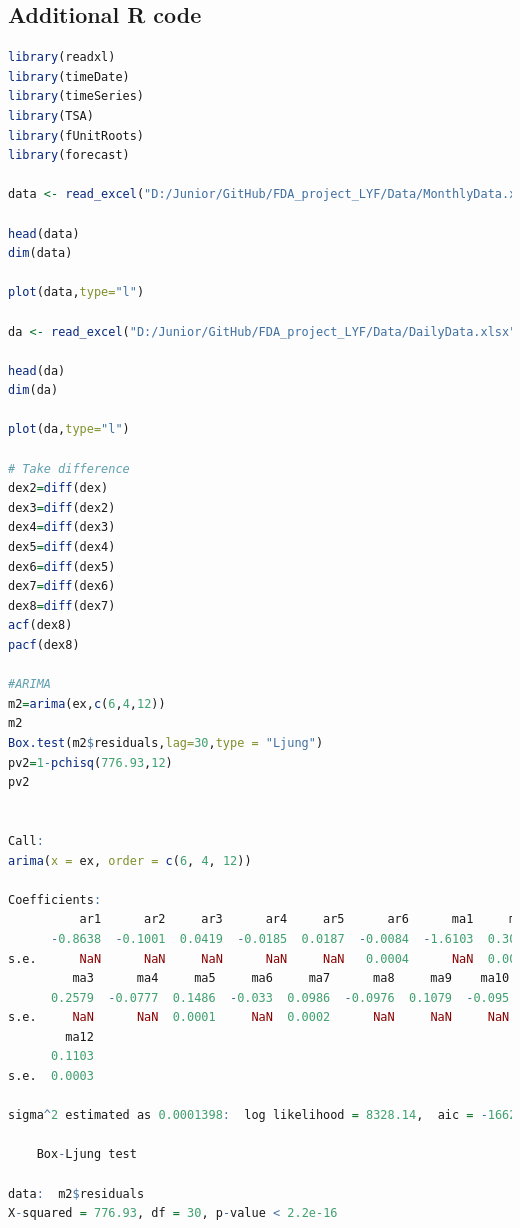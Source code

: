 \documentclass[12pt, a4paper, titlepage]{article}
\begin{document}
\subsection*{Additional R code}
\begin{lstlisting}[language=R] 
library(readxl)
library(timeDate)
library(timeSeries)
library(TSA)
library(fUnitRoots)
library(forecast)

data <- read_excel("D:/Junior/GitHub/FDA_project_LYF/Data/MonthlyData.xls")

head(data)
dim(data)

plot(data,type="l")

da <- read_excel("D:/Junior/GitHub/FDA_project_LYF/Data/DailyData.xlsx")

head(da)
dim(da)

plot(da,type="l")

# Take difference
dex2=diff(dex)
dex3=diff(dex2)
dex4=diff(dex3)
dex5=diff(dex4)
dex6=diff(dex5)
dex7=diff(dex6)
dex8=diff(dex7)
acf(dex8)
pacf(dex8)

#ARIMA
m2=arima(ex,c(6,4,12))
m2
Box.test(m2$residuals,lag=30,type = "Ljung")
pv2=1-pchisq(776.93,12)
pv2


Call:
arima(x = ex, order = c(6, 4, 12))

Coefficients:
          ar1      ar2     ar3      ar4     ar5      ar6      ma1     ma2
      -0.8638  -0.1001  0.0419  -0.0185  0.0187  -0.0084  -1.6103  0.3084
s.e.      NaN      NaN     NaN      NaN     NaN   0.0004      NaN  0.0003
         ma3      ma4     ma5     ma6     ma7      ma8     ma9    ma10     ma11
      0.2579  -0.0777  0.1486  -0.033  0.0986  -0.0976  0.1079  -0.095  -0.1169
s.e.     NaN      NaN  0.0001     NaN  0.0002      NaN     NaN     NaN   0.0004
        ma12
      0.1103
s.e.  0.0003

sigma^2 estimated as 0.0001398:  log likelihood = 8328.14,  aic = -16620.28

	Box-Ljung test

data:  m2$residuals
X-squared = 776.93, df = 30, p-value < 2.2e-16
\end{lstlisting}
\end{document}
